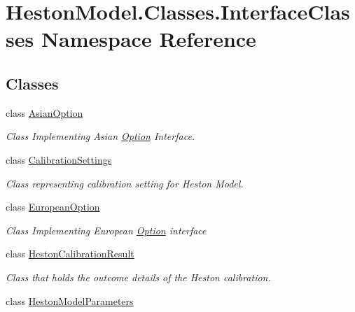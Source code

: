 \hypertarget{namespace_heston_model_1_1_classes_1_1_interface_classes}{}\section{Heston\+Model.\+Classes.\+Interface\+Classes Namespace Reference}
\label{namespace_heston_model_1_1_classes_1_1_interface_classes}
\subsection*{Classes}
\begin{DoxyCompactItemize}
\item 
class \mbox{\hyperlink{class_heston_model_1_1_classes_1_1_interface_classes_1_1_asian_option}{Asian\+Option}}
\begin{DoxyCompactList}\small\item\em Class Implementing Asian \mbox{\hyperlink{class_heston_model_1_1_classes_1_1_interface_classes_1_1_option}{Option}} Interface. \end{DoxyCompactList}\item 
class \mbox{\hyperlink{class_heston_model_1_1_classes_1_1_interface_classes_1_1_calibration_settings}{Calibration\+Settings}}
\begin{DoxyCompactList}\small\item\em Class representing calibration setting for Heston Model. \end{DoxyCompactList}\item 
class \mbox{\hyperlink{class_heston_model_1_1_classes_1_1_interface_classes_1_1_european_option}{European\+Option}}
\begin{DoxyCompactList}\small\item\em Class Implementing European \mbox{\hyperlink{class_heston_model_1_1_classes_1_1_interface_classes_1_1_option}{Option}} interface \end{DoxyCompactList}\item 
class \mbox{\hyperlink{class_heston_model_1_1_classes_1_1_interface_classes_1_1_heston_calibration_result}{Heston\+Calibration\+Result}}
\begin{DoxyCompactList}\small\item\em Class that holds the outcome details of the Heston calibration. \end{DoxyCompactList}\item 
class \mbox{\hyperlink{class_heston_model_1_1_classes_1_1_interface_classes_1_1_heston_model_parameters}{Heston\+Model\+Parameters}}

\end{DoxyCompactItemize}
